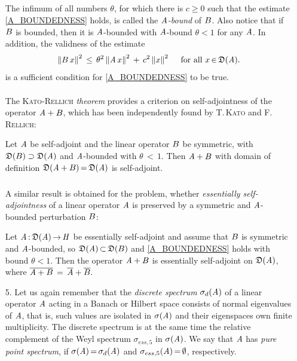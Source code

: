\documentclass[11pt,twoside]{article}
\begin{document}
\begin{itemize}[leftmargin=4mm,itemsep=5pt]
\subparagraph{} %
The infimum of all numbers $\theta$,
for which there is $c \geq 0$
such that the estimate \eqref{A_BOUNDEDNESS} holds,
is called the $\linA$\textit{-bound} of $\linB$.
Also notice that
if $\linB$ is bounded,
then it is $\linA$-bounded with $\linA$-bound $\theta <1$ for any $\linA$.
In addition,
the validness of the estimate
\[
\norm{\linB \,x}^2 \, \leq \,
\theta^2 \norm{\linA \,x}^2 \+ c^2 \norm{x}^2
\qfa x \xeof \domain{\linA}.
\]
is a sufficient condition for \eqref{A_BOUNDEDNESS} to be true.

\paragraph{} %
The \textsc{Kato-Rellich} \textit{theorem} provides a criterion
on self-adjoint\-ness of the operator $\linA + \linB$,
which has been independently found by \textsc{T.\,Kato}
and \textsc{F.\,Rellich}:

\begin{theorem1}\label{KATO-RELLICH_THEOREM}
Let $\linA$ be self-adjoint and 
the linear operator $\linB$ be symmetric,
with $\domain{\linB} \supset \domain{\linA}$ 
and $\linA$-bounded with $\theta {\,<\,} 1$.
Then $\linA + \linB$ with domain of definition 
$\domain{\linA + \linB} \eq \domain{\linA}$ is self-adjoint.
\end{theorem1}

\subparagraph{} %
A similar result is obtained for the problem,
whether \textit{essentially self-adjointness} of a linear operator $\linA$
is preserved by a symmetric and $\linA$-bounded perturbation $\linB$:

\begin{theorem1}\label{KATO-RELLICH_THEOREM_II}
Let $\linA \: \domain{\linA} \xto \hilH$ be essentially self-adjoint
and assume that $\linB$ is symmetric and $\linA$-bounded,
so $\domain{\linA} \xsubset \domain{\linB}$ and \eqref{A_BOUNDEDNESS} holds
with bound $\theta < 1$.
Then the operator $\linA + \linB$
is essentially self-adjoint on $\domain{\linA}$,
where
$
\overline{\linA + \linB} \= \overline{\linA} + \overline{\linB}.
$
\end{theorem1}

\item[5.] %
Let us again remember
that the \textit{discrete spectrum} $\sigma_d(\mathit{A})$
of a linear operator $\linA$ acting in a Banach or Hilbert space
consists of normal eigenvalues of $\linA$,
that is,
such values are isolated in $\sigma(\mathit{A})$ and their eigen\-spaces
own finite multiplicity.
The discrete spectrum is at the same time
the relative complement of the Weyl spectrum $\sigma_{ess,5}$
in $\sigma(\mathit{A})$.
We say that $\linA$ has \textit{pure point spectrum},
if $\sigma(\mathit{A}) {\,=\,} \sigma_d(\mathit{A})$ and 
$\sigma_{ess,5}(\mathit{A}) {\,=\,} \emptyset$,
respectively.


\end{itemize}
\end{document}
